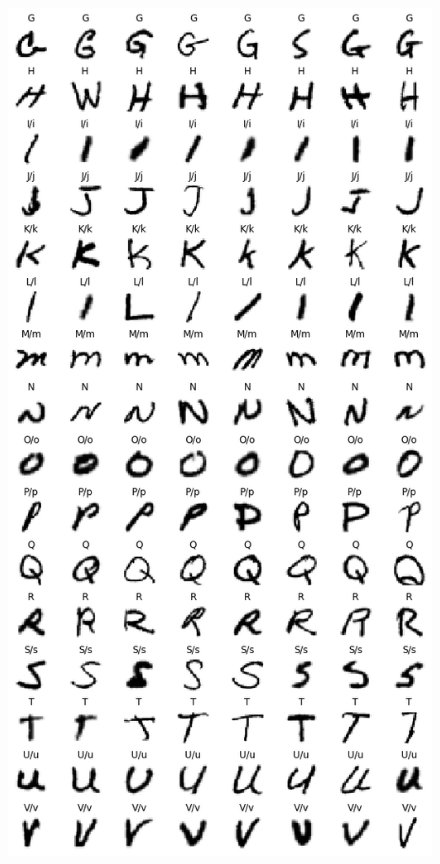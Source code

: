 \documentclass[12pt, spanish]{article}
\begin{document}
\begin{figure}[hbt!]
\begin{minipage}{.33\textwidth}
  \includegraphics[width=.95\linewidth]{images/samples_by_label2.png}
\end{minipage}%
\begin{minipage}{.33\textwidth}
  \centering

\end{minipage}
\end{figure}
\end{document}
